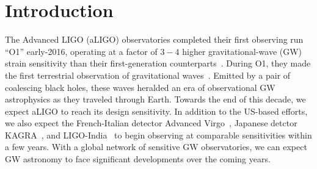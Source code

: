 \documentclass[aps,prd,amsmath,floats,floatfix, twocolumn,
superscriptaddress,nofootinbib,showpacs]{revtex4-1}
\begin{document}
\pacs{}

\maketitle

\section{Introduction}\label{s1:introduction}

The Advanced LIGO (aLIGO) observatories completed their first observing run ``O1''
early-2016, operating at a factor of $3-4$ higher gravitational-wave
(GW) strain sensitivity than their first-generation 
counterparts~\cite{Shoemaker2009}.
% 
During O1, they made the first terrestrial observation of gravitational 
waves~\cite{LIGOVirgo2016a}. Emitted by a pair of coalescing black holes, these
waves heralded an era of observational GW astrophysics as they traveled 
through Earth.
% 
Towards the end of this decade, we expect aLIGO to reach its design sensitivity.
In addition to the US-based efforts, we also expect the French-Italian detector Advanced
Virgo~\cite{aVIRGO,aVirgo2}, Japanese detctor KAGRA~\cite{kagra,Somiya:2011np},
and LIGO-India~\cite{2013IJMPD..2241010U} to begin observing at comparable
sensitivities within a few years. With a global network of sensitive GW
 observatories, we can expect GW astronomy to face significant developments over the
coming years.
% 
\end{document}
